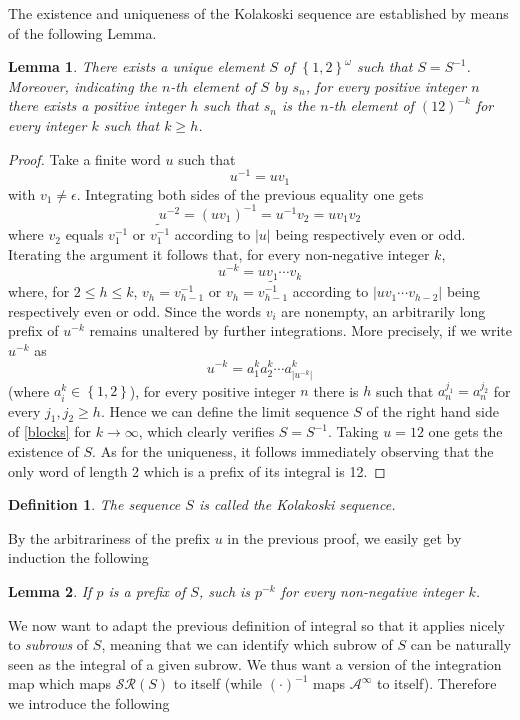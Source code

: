 \documentclass[10pt,a4paper]{article}
\newtheorem{lemma}{Lemma}
\newtheorem{defi}{Definition}
\begin{document}
The existence and uniqueness of the Kolakoski sequence are established by means of the following Lemma. 
\begin{lemma}
There exists a unique element $S$ of $\left\lbrace 1,2 \right\rbrace^{\omega}$ such that $S=S^{-1}$. Moreover, indicating the $n$-th element of $S$ by $s_n$, for every positive integer $n$ there exists a positive integer $h$ such that $s_n$ is the $n$-th element of $(12)^{-k}$ for every integer $k$ such that $k\ge h$.
\label{lemma1}
\end{lemma}
\begin{proof}
Take a finite word $u$ such that $$u^{-1}=uv_1$$ with $v_1\ne\epsilon$. Integrating both sides of the previous equality one gets $$u^{-2}=(uv_1)^{-1}=u^{-1}v_2=uv_1v_2$$ where $v_2$ equals $v_1^{-1}$ or $\widetilde{v_1^{-1}}$ according to $|u|$ being respectively even or odd. Iterating the argument it follows that, for every non-negative integer $k$,  
\begin{equation}
u^{-k}=uv_1\cdots v_k
\label{blocks}
\end{equation}
where, for $2\le h\le k$, $v_h=v_{h-1}^{-1}$ or $v_h=\widetilde{v_{h-1}^{-1}}$ according to $|uv_1\cdots v_{h-2}|$ being respectively even or odd.
Since the words $v_i$ are nonempty, an arbitrarily long prefix of $u^{-k}$ remains unaltered by further integrations. More precisely, if we write $u^{-k}$ as $$u^{-k}=a_1^ka_2^k\cdots a_{|u^{-k}|}^k$$ (where $a_i ^k\in \left\lbrace 1,2\right\rbrace$), for every positive integer $n$ there is $h$ such that $a_n^{j_1}=a_n^{j_2}$ for every $j_1,j_2\ge h$. Hence we can define the limit sequence $S$ of the right hand side of \eqref{blocks} for $k\rightarrow\infty$, which clearly verifies $S=S^{-1}$. Taking $u=12$ one gets the existence of $S$. As for the uniqueness, it follows immediately observing that the only word of length 2 which is a prefix of its integral is 12.     
\end{proof}
\begin{defi}
The sequence $S$ is called the \textit{Kolakoski sequence}. 
\end{defi}
By the arbitrariness of the prefix $u$ in the previous proof, we easily get by induction the following
\begin{lemma}
If $p$ is a prefix of $S$, such is $p^{-k}$ for every non-negative integer $k$. 
\label{furtherintegration}
\end{lemma}
We now want to adapt the previous definition of integral so that it applies nicely to \textit{subrows} of $S$, meaning that we can identify which subrow of $S$ can be naturally seen as the integral of a given subrow. We thus want a version of the integration map which maps $\mathcal{SR}(S)$  to itself (while $(\cdot)^{-1}$ maps $\mathcal{A}^{\infty}$ to itself).  Therefore we introduce the following
\end{document}
